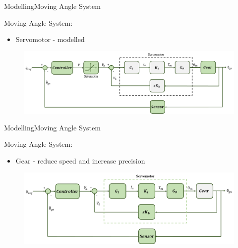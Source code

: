\begin{frame}{Modelling}{Moving Angle System}
  \begin{block}{Moving Angle System:}

	  \begin{itemize}
	  	\item Servomotor - modelled
	  \end{itemize}

	  \begin{figure}
        \includegraphics[scale=0.24]{../report/figures/servo+gear+noise+servomotor.png}
      \end{figure}
  
  \end{block}
\end{frame}

\begin{frame}{Modelling}{Moving Angle System}
  \begin{block}{Moving Angle System:}
	  \begin{itemize}
	  	\item Gear - reduce speed and increase precision
	  \end{itemize}
	  \begin{figure}
        \includegraphics[scale=0.24]{../report/figures/servo+gear+noise+gear.png}
      \end{figure}  
  \end{block}
\end{frame}

